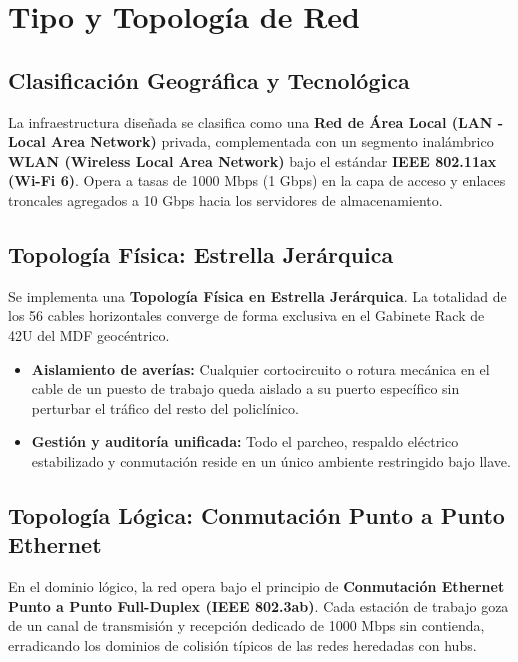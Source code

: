 \documentclass[11pt,a4paper]{article}
\begin{document}
\section{Tipo y Topología de Red}

\subsection{Clasificación Geográfica y Tecnológica}
La infraestructura diseñada se clasifica como una \textbf{Red de Área Local (LAN - Local Area Network)} privada, complementada con un segmento inalámbrico \textbf{WLAN (Wireless Local Area Network)} bajo el estándar \textbf{IEEE 802.11ax (Wi-Fi 6)}. Opera a tasas de 1000 Mbps (1 Gbps) en la capa de acceso y enlaces troncales agregados a 10 Gbps hacia los servidores de almacenamiento.

\subsection{Topología Física: Estrella Jerárquica}
Se implementa una \textbf{Topología Física en Estrella Jerárquica}. La totalidad de los 56 cables horizontales converge de forma exclusiva en el Gabinete Rack de 42U del MDF geocéntrico.
\begin{itemize}[noitemsep]
    \item \textbf{Aislamiento de averías:} Cualquier cortocircuito o rotura mecánica en el cable de un puesto de trabajo queda aislado a su puerto específico sin perturbar el tráfico del resto del policlínico.
    \item \textbf{Gestión y auditoría unificada:} Todo el parcheo, respaldo eléctrico estabilizado y conmutación reside en un único ambiente restringido bajo llave.
\end{itemize}

\subsection{Topología Lógica: Conmutación Punto a Punto Ethernet}
En el dominio lógico, la red opera bajo el principio de \textbf{Conmutación Ethernet Punto a Punto Full-Duplex (IEEE 802.3ab)}. Cada estación de trabajo goza de un canal de transmisión y recepción dedicado de 1000 Mbps sin contienda, erradicando los dominios de colisión típicos de las redes heredadas con hubs.
\end{document}
